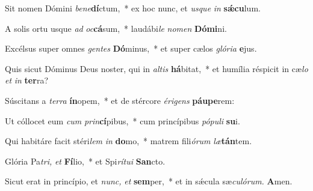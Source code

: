 \item Sit nomen Dómini \textit{be}\textit{ne}\textbf{dí}ctum,~* ex hoc nunc, et \textit{usque} \textit{in} \textbf{sǽcu}lum.
\item A solis ortu usque \textit{ad} \textit{oc}\textbf{cá}sum,~* laudábi\hspace{0.03em}\textit{le} \textit{nomen} \textbf{Dómi}ni.
\item Excélsus super omnes \textit{gentes} \textbf{Dó}minus,~* et super cælos \textit{glória} \textbf{e}jus.
\item Quis sicut Dóminus Deus noster, qui in \textit{altis} \textbf{há}bitat,~* et humília réspicit in cæ\hspace{0.03em}\textit{lo} \textit{et} \textit{in} \textbf{ter}ra?
\item Súscitans a \textit{terra} \textbf{ín}opem,~* et de stércore \textit{érigens} \textbf{páu}\textbf{pe}rem:
\item Ut cóllocet eum \textit{cum} \textit{prin}\textbf{cí}pibus,~* cum princípibus \textit{pópuli} \textbf{su}i.
\item Qui habitáre facit stéri\hspace{0.03em}\textit{lem} \textit{in} \textbf{do}mo,~* matrem fili\hspace{0.03em}\textit{órum} \textit{læ}\textbf{tán}tem.
\item Glória Pa\hspace{0.03em}\textit{tri,} \textit{et} \textbf{Fí}lio,~* et Spi\hspace{0.03em}\textit{rítui} \textbf{San}cto.
\item Sicut erat in princípio, et \textit{nunc,} \textit{et} \textbf{sem}per,~* et in sǽcula sæ\hspace{0.03em}\textit{culórum.} \textbf{A}men.